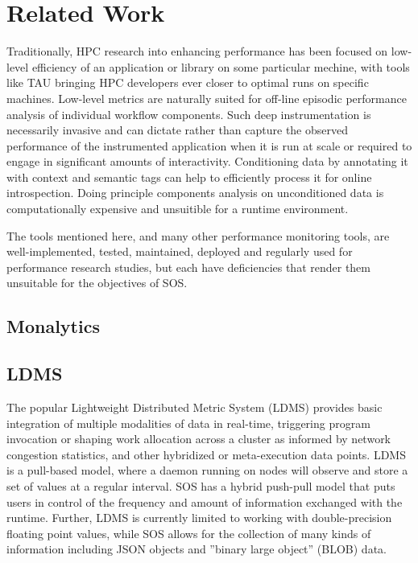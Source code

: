 \section{Related Work}
%
Traditionally, HPC research into enhancing performance has been
focused on low-level efficiency of an application or library on some
particular mechine, with tools like TAU bringing HPC developers ever
closer to optimal runs on specific machines.
%
Low-level metrics are naturally suited for off-line episodic
performance analysis of individual workflow components.
%
Such deep instrumentation is necessarily invasive and can dictate
rather than capture the observed performance of the instrumented
application when it is run at scale or required to engage in
significant amounts of interactivity.
%
Conditioning data by annotating it with context and semantic tags can
help to efficiently process it for online introspection.
%
Doing principle components analysis on unconditioned data is
computationally expensive and unsuitible for a runtime environment.
%
\par
%
The tools mentioned here, and many other performance monitoring tools, are
well-implemented, tested, maintained, deployed and regularly used for
performance research studies, but each have deficiencies that render them
unsuitable for the objectives of SOS.



\subsection{Monalytics} %
%
%
\subsection{LDMS} %
%
The popular Lightweight Distributed Metric System (LDMS)
\cite{agelastos2014lightweight} provides basic integration of multiple
modalities of data in real-time, triggering program invocation or
shaping work allocation across a cluster as informed by network
congestion statistics, and other hybridized or meta-execution data
points.
%
LDMS is a pull-based model, where a daemon running on nodes will
observe and store a set of values at a regular interval.
%
SOS has a hybrid push-pull model that puts users in control of the
frequency and amount of information exchanged with the runtime.
%
Further, LDMS is currently limited to working with double-precision
floating point values, while SOS allows for the collection of many
kinds of information including JSON objects and ''binary large
object'' (BLOB) data.
%
